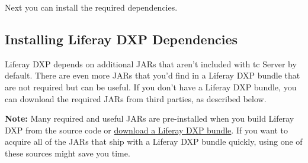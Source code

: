 Next you can install the required dependencies.

\subsection{Installing Liferay DXP
Dependencies}\label{installing-liferay-dxp-dependencies}

Liferay DXP depends on additional JARs that aren't included with tc
Server by default. There are even more JARs that you'd find in a Liferay
DXP bundle that are not required but can be useful. If you don't have a
Liferay DXP bundle, you can download the required JARs from third
parties, as described below.

\noindent\hrulefill

\textbf{Note:} Many required and useful JARs are pre-installed when you
build Liferay DXP from the source code or
\href{https://web.liferay.com/group/customer/dxp/downloads/7-1}{download
a Liferay DXP bundle}. If you want to acquire all of the JARs that ship
with a Liferay DXP bundle quickly, using one of these sources might save
you time.

\noindent\hrulefill

